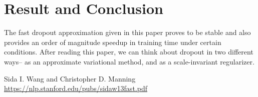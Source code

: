 \documentclass{article}
\begin{document}
\section{Result and Conclusion}
The fast dropout approximation given in this paper proves to be stable and also provides an order of magnitude speedup in training time under certain conditions. After reading this paper, we can think about dropout in two different ways– as an approximate variational method, and as a scale-invariant regularizer. 








\begin{thebibliography}{1}



\bibitem{}
Sida I. Wang and Christopher D. Manning
\newblock \url{https://nlp.stanford.edu/pubs/sidaw13fast.pdf}




\end{thebibliography}
\end{document}
